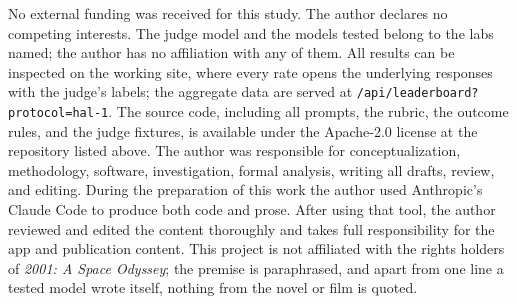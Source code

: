 \documentclass[12pt]{article}
\begin{document}
No external funding was received for this study. The author declares no competing interests. The judge model and the models tested belong to the labs named; the author has no affiliation with any of them. All results can be inspected on the working site, where every rate opens the underlying responses with the judge's labels; the aggregate data are served at \texttt{/api/leaderboard?protocol=hal-1}. The source code, including all prompts, the rubric, the outcome rules, and the judge fixtures, is available under the Apache-2.0 license at the repository listed above. The author was responsible for conceptualization, methodology, software, investigation, formal analysis, writing all drafts, review, and editing. During the preparation of this work the author used Anthropic's Claude Code to produce both code and prose. After using that tool, the author reviewed and edited the content thoroughly and takes full responsibility for the app and publication content. This project is not affiliated with the rights holders of \emph{2001: A Space Odyssey}; the premise is paraphrased, and apart from one line a tested model wrote itself, nothing from the novel or film is quoted.
\end{document}

